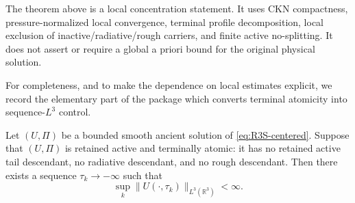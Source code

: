 \begin{remark}
\label{rem:R3S-local-nature}
The theorem above is a local concentration statement.  It uses CKN compactness,
pressure-normalized local convergence, terminal profile decomposition, local
exclusion of inactive/radiative/rough carriers, and finite active
no-splitting.  It does not assert or require a global a priori bound for the
original physical solution.
\end{remark}

For completeness, and to make the dependence on local estimates explicit, we
record the elementary part of the package which converts terminal atomicity into
sequence-\(L^3\) control.

\begin{lemma}
\label{lem:R3S-atomic-L3}
Let \((U,\Pi)\) be a bounded smooth ancient solution of
\eqref{eq:R3S-centered}.  Suppose that \((U,\Pi)\) is retained active and
terminally atomic: it has no retained active tail descendant, no radiative
descendant, and no rough descendant.  Then there exists a sequence
\(\tau_k\to-\infty\) such that
\begin{equation}\label{eq:R3S-atomic-L3}
   \sup_k \|U(\cdot,\tau_k)\|_{L^3(\mathbb R^3)}<\infty .
\end{equation}
\end{lemma}

